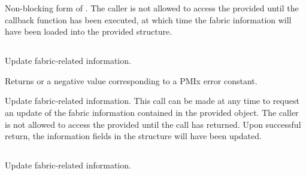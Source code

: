 \descr

Non-blocking form of . The caller is not allowed to access the provided  until the callback function has been executed, at which time the fabric information will have been loaded into the provided structure.

\subsection{}

\summary

Update fabric-related information.

\format


\begin{arglist}
\end{arglist}

Returns  or a negative value corresponding to a \ac{PMIx} error constant.

\descr

Update fabric-related information. This call can be made at any time to request an update of the fabric information contained in the provided  object. The caller is not allowed to access the provided  until the call has returned. Upon successful return, the information fields in the  structure will have been updated.


\subsection{}

\summary

Update fabric-related information.

\format


